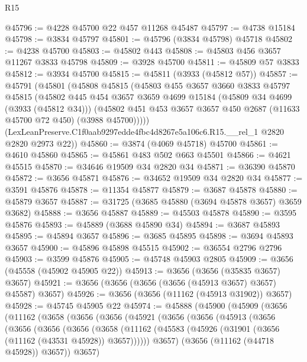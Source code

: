\begin{lexlean}{R15}
\begin{coremodule}
@45796 := @4228 @45700 @22 @457 @11268 @45487
@45797 := @4738 @15184
@45798 := @3834 @45797
@45801 := @45796 (@3834 @45798) @45718
@45802 := @4238 @45700
@45803 := @45802 @443
@45808 := @45803 @456 @3657 @11267 @3833 @45798
@45809 := @3928 @45700
@45811 := @45809 @57 @3833
@45812 := @3934 @45700
@45815 := @45811 (@3933 (@45812 @57))
@45857 := @45791
    (@45801
      (@45808
        @45815
        (@45803
          @455
          @3657
          @3660
          @3833
          @45797
          @45815
          (@45802
            @445
            @454
            @3657
            @3659
            @4699
            @15184
            (@45809 @34 @4699 (@3933 (@45812 @34)))
            (@45802 @451 @453 @3657 @3657 @450 @2687 (@11633 @45700 @72 @450) (@3988 @45700)))))
      (LexLeanPreserve.C1f0aab9297edde4fbc4d8267e5a106c6.R15.__rel_1 @2820 @2820 @2973 @22))
@45860 := @3874 (@4069 @45718) @45700
@45861 := @4610 @45860
@45865 := @45861 @483 @502 @663 @45501
@45866 := @4621 @45515
@45870 := @34646 @19509 @34 @2820 @34
@45871 := @36390 @45870
@45872 := @3656 @45871
@45876 := @34652 @19509 @34 @2820 @34
@45877 := @3591 @45876
@45878 := @11354 @45877
@45879 := @3687 @45878
@45880 := @45879 @3657
@45887 := @31725 (@3685 @45880 (@3694 @45878 @3657) @3659 @3682)
@45888 := @3656 @45887
@45889 := @45503 @45878
@45890 := @3595 @45876
@45893 := @45889 (@3688 @45890 @34)
@45894 := @3687 @45893
@45895 := @45894 @3657
@45896 := @3685 @45895
@45898 := @3694 @45893 @3657
@45900 := @45896 @45898 @45515
@45902 := @36554 @2796 @2796
@45903 := @3599 @45876
@45905 := @45748 @45903 @2805
@45909 := @3656 (@45558 (@45902 @45905 @22))
@45913 := @3656 (@3656 (@35835 @3657) @3657)
@45921 := @3656 (@3656 (@3656 (@3656 (@45913 @3657) @3657) @45587) @3657)
@45926 := @3656 (@3656 (@11162 (@45913 @31902)) @3657)
@45928 := @45745 @45905 @22
@45974 := @45888
    (@45900
      (@45909
        (@3656
          (@11162
            (@3658
              (@3656
                (@3656
                  (@45921
                    (@3656
                      (@3656
                        (@45913
                          (@3656
                            (@3656
                              (@3656
                                (@3656
                                  (@3658
                                    (@11162
                                      (@45583
                                        (@45926 (@31901 (@3656 (@11162 (@43531 @45928)) @3657))))))
                                  @3657)
                                (@3656 (@11162 (@44718 @45928)) @3657))
                              @3657)

\end{coremodule}
\end{lexlean}

